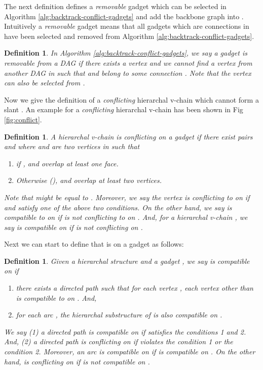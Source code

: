 \documentclass[11pt]{article}
\newtheorem{definition}[figure]{Definition}
\begin{document}
The next definition
defines a \emph{removable} gadget 
which can be selected in Algorithm \ref{alg:backtrack-conflict-gadgets}
and add the backbone graph  into  .
Intuitively a \emph{removable} gadget  means that
all gadgets  which are connections  in 
have been selected and removed from Algorithm \ref{alg:backtrack-conflict-gadgets}.

\begin{definition}\label{def:removable-gadget}
In Algorithm \ref{alg:backtrack-conflict-gadgets},
we say a gadget  is \emph{removable} from a DAG  
if there exists a vertex  and
we cannot find a vertex  from another DAG  in 
such that
 and  belong to some connection .
Note that the vertex  can also be selected from .
\end{definition}


Now we give the definition of a \emph{conflicting} hierarchal v-chain  which
cannot form a slant  . An example for
a \emph{conflicting} hierarchal v-chain  has been shown in Fig \ref{fig:conflict}.
\begin{definition}\label{def:non-conflicting-v-chain}
A hierarchal v-chain 
is \emph{conflicting} on a gadget  if
there exist pairs  and  where
 and  are two vertices in 
such that
\begin{enumerate}
\item if ,  and  overlap at least one face.
\item Otherwise (),  and  overlap at least two vertices.
\end{enumerate}
Note that  might be equal to .
Moreover, we say
the vertex  is \emph{conflicting} to  on 
if  and  satisfy one of the above two conditions.
On the other hand,
we say  is \emph{compatible} to  on 
if  is not conflicting to  on .
And,
for a hierarchal v-chain , we say  is \emph{compatible} on 
if  is not conflicting on .
\end{definition}


Next we can start to define that
 is  on a gadget 
as follows:
\begin{definition}
Given a hierarchal structure  and a gadget ,
we say  is \emph{compatible} on  if
\begin{enumerate}
\item there exists a directed path  such that
for each vertex ,
each vertex  other than 
is compatible to  on . And,
\item for each arc ,
the hierarchal substructure  of  is also compatible on .
\end{enumerate}
We say (1) a directed path  is \emph{compatible} on 
if  satisfies the conditions 1 and 2. And,
(2) a directed path  is \emph{conflicting} on 
if  violates the condition 1 or the condition 2.
Moreover, an arc  is \emph{compatible}
on  if
 is compatible on .
On the other hand,  is \emph{conflicting} on  if
 is not compatible on .
\end{definition}
\end{document}
